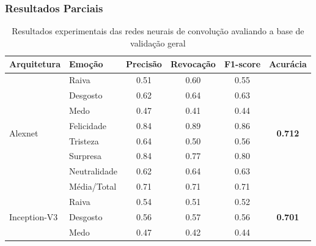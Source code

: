 \documentclass{beamer}
\begin{document}
\begin{frame}
 \frametitle{Resultados Parciais}
\begin{table}[]
\tiny
\centering
\caption{Resultados experimentais das redes neurais de convolução avaliando a base de validação geral}
\label{table:resultsexp}
\begin{tabular}{llcccc}
\hline
\textbf{Arquitetura}                & \textbf{Emoção}       & \textbf{Precisão} & \textbf{Revocação} & \textbf{F1-score} & \textbf{Acurácia}               \\ \hline
\multirow{8}{*}{Alexnet}            & Raiva                 & 0.51              & 0.60               & 0.55              & \multirow{8}{*}{\scriptsize \textbf{0.712}}          \\
                                    & Desgosto              & 0.62              & 0.64               & 0.63              &                                 \\
                                    & Medo                  & 0.47              & 0.41               & 0.44              &                                 \\
                                    & Felicidade            & 0.84              & 0.89               & 0.86              &                                 \\
                                    & Tristeza              & 0.64              & 0.50               & 0.56              &                                 \\
                                    & Surpresa              & 0.84              & 0.77               & 0.80              &                                 \\
                                    & Neutralidade          & 0.62              & 0.64               & 0.63              &                                 \\
                                    & Média/Total           & 0.71              & 0.71               & 0.71              &                                 \\ \hline
\multirow{8}{*}{Inception-V3}       & Raiva                 & 0.54              & 0.51               & 0.52              & \multirow{8}{*}{\scriptsize \textbf{0.701}}          \\
                                    & Desgosto              & 0.56              & 0.57               & 0.56              &                                 \\
                                    & Medo                  & 0.47              & 0.42               & 0.44              &                                 \\

\end{tabular}
\end{table}
\end{frame}
\end{document}
